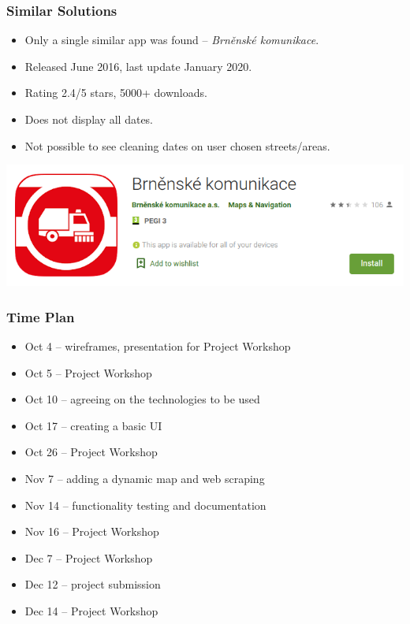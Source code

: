 \documentclass[10pt,xcolor=pdflatex,hyperref={unicode}]{beamer}
\begin{document}
\begin{frame}\frametitle{Similar Solutions}
    \doublespacing
    \begin{itemize}
        \item Only a single similar app was found -- \emph{Brněnské komunikace}.
        \item Released June 2016, last update January 2020.
        \item Rating 2.4/5 stars, 5000+ downloads.
        \item Does not display all dates.
        \item Not possible to see cleaning dates on user chosen streets/areas.
    \end{itemize}
    \vspace{0.25cm}
    
    \begin{center}
        \includegraphics[width=0.75\paperwidth]{img/block-cleaning-4.png}
    \end{center}
\end{frame}


\begin{frame}\frametitle{Time Plan}
    \begin{itemize}
        \item[] \alert{Oct 4} -- wireframes, presentation for Project Workshop
        \item[] \alert{Oct 5} -- Project Workshop
        \item[] \alert{Oct 10} -- agreeing on the technologies to be used
        \item[] \alert{Oct 17} -- creating a basic UI
        \item[] \alert{Oct 26} -- Project Workshop
        \item[] \alert{Nov 7}  -- adding a dynamic map and web scraping
        \item[] \alert{Nov 14} -- functionality testing and documentation
        \item[] \alert{Nov 16} -- Project Workshop
        \item[] \alert{Dec 7}  -- Project Workshop
        \item[] \alert{Dec 12} -- project submission
        \item[] \alert{Dec 14} -- Project Workshop
    \end{itemize}
\end{frame}


\end{document}

